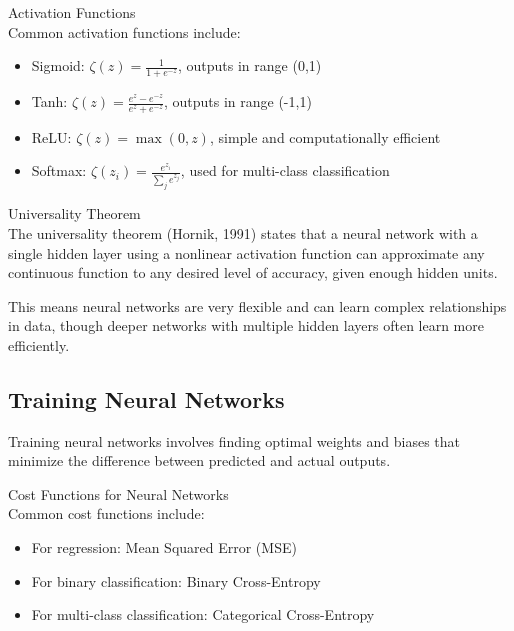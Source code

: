 \begin{definition}{Activation Functions}\\
Common activation functions include:
\begin{itemize}
    \item Sigmoid: $\zeta(z) = \frac{1}{1 + e^{-z}}$, outputs in range (0,1)
    \item Tanh: $\zeta(z) = \frac{e^z - e^{-z}}{e^z + e^{-z}}$, outputs in range (-1,1)
    \item ReLU: $\zeta(z) = \max(0, z)$, simple and computationally efficient
    \item Softmax: $\zeta(z_i) = \frac{e^{z_i}}{\sum_{j} e^{z_j}}$, used for multi-class classification
\end{itemize}
\end{definition}

\begin{concept}{Universality Theorem}\\
The universality theorem (Hornik, 1991) states that a neural network with a single hidden layer using a nonlinear activation function can approximate any continuous function to any desired level of accuracy, given enough hidden units.

This means neural networks are very flexible and can learn complex relationships in data, though deeper networks with multiple hidden layers often learn more efficiently.
\end{concept}

\subsection{Training Neural Networks}

Training neural networks involves finding optimal weights and biases that minimize the difference between predicted and actual outputs.

\begin{definition}{Cost Functions for Neural Networks}\\
Common cost functions include:
\begin{itemize}
    \item For regression: Mean Squared Error (MSE)
    \item For binary classification: Binary Cross-Entropy
    \item For multi-class classification: Categorical Cross-Entropy
\end{itemize}
\end{definition}

